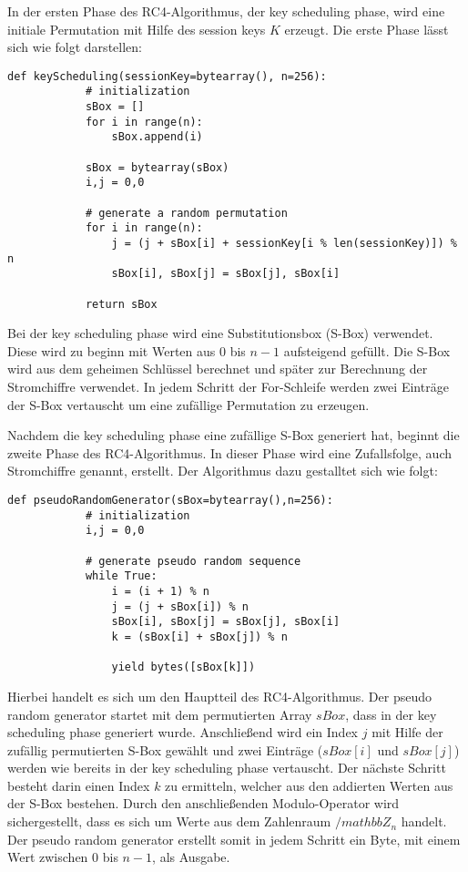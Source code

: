 \documentclass[10pt,a4paper]{article}
\begin{document}
In der ersten Phase des RC4-Algorithmus, der key scheduling phase, wird eine initiale Permutation mit Hilfe des session keys $K$ erzeugt. Die erste Phase lässt sich wie folgt darstellen:
\begin{lstlisting}[backgroundcolor=\color{grey}]
		def keyScheduling(sessionKey=bytearray(), n=256):
    		# initialization
    		sBox = []
    		for i in range(n):
        		sBox.append(i)

    		sBox = bytearray(sBox)
    		i,j = 0,0

    		# generate a random permutation
    		for i in range(n):
        		j = (j + sBox[i] + sessionKey[i % len(sessionKey)]) % n
        		sBox[i], sBox[j] = sBox[j], sBox[i]

    		return sBox
\end{lstlisting}
Bei der key scheduling phase wird eine Substitutionsbox (S-Box) verwendet. Diese wird zu beginn mit Werten aus 0 bis $n-1$ aufsteigend gefüllt. Die S-Box wird aus dem geheimen Schlüssel berechnet und später zur Berechnung der Stromchiffre verwendet. In jedem Schritt der For-Schleife werden zwei Einträge der S-Box vertauscht um eine zufällige Permutation zu erzeugen. 

Nachdem die key scheduling phase eine zufällige S-Box generiert hat, beginnt die zweite Phase des RC4-Algorithmus. In dieser Phase wird eine Zufallsfolge, auch Stromchiffre genannt, erstellt. Der Algorithmus dazu gestalltet sich wie folgt:
\begin{lstlisting}[backgroundcolor=\color{grey}]
		def pseudoRandomGenerator(sBox=bytearray(),n=256):
    		# initialization
    		i,j = 0,0

    		# generate pseudo random sequence
    		while True:
        		i = (i + 1) % n
        		j = (j + sBox[i]) % n
        		sBox[i], sBox[j] = sBox[j], sBox[i]
        		k = (sBox[i] + sBox[j]) % n

        		yield bytes([sBox[k]])
\end{lstlisting}
Hierbei handelt es sich um den Hauptteil des RC4-Algorithmus.  Der pseudo random generator startet mit dem permutierten Array $sBox$, dass in der key scheduling phase generiert wurde. Anschließend wird ein Index $j$ mit Hilfe der zufällig permutierten S-Box gewählt und zwei Einträge ($sBox[i]$ und $sBox[j]$) werden wie bereits in der key scheduling phase vertauscht. Der nächste Schritt besteht darin einen Index $k$ zu ermitteln, welcher aus den addierten Werten aus der S-Box bestehen. Durch den anschließenden Modulo-Operator wird sichergestellt, dass es sich um Werte aus dem Zahlenraum $/mathbb{Z}_n$ handelt. Der pseudo random generator erstellt somit in jedem Schritt ein Byte, mit einem Wert zwischen $0$ bis $n-1$, als Ausgabe.
\end{document}
